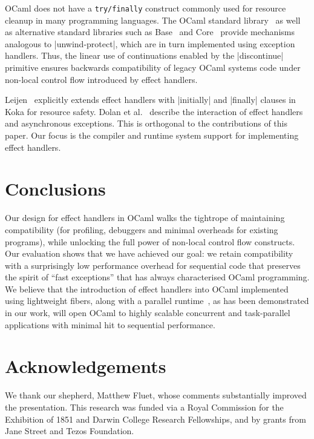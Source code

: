 \documentclass[sigplan,screen]{acmart}
\begin{document}
OCaml does not have a \texttt{\footnotesize try/finally} construct commonly
used for resource cleanup in many programming languages. The OCaml standard
library~\cite{FunProtect} as well as alternative standard libraries such as
Base~\cite{BaseProtect} and Core~\cite{CoreProtect} provide mechanisms
analogous to |unwind-protect|, which are in turn implemented using exception
handlers. Thus, the linear use of continuations enabled by the |discontinue|
primitive ensures backwards compatibility of legacy OCaml systems code under
non-local control flow introduced by effect handlers.

Leijen~\cite{Leijen18} explicitly extends effect handlers with |initially| and
|finally| clauses in Koka for resource safety. Dolan et al.~\cite{TFP17}
describe the interaction of effect handlers and asynchronous exceptions. This
is orthogonal to the contributions of this paper. Our focus is the compiler and
runtime system support for implementing effect handlers.

\section{Conclusions}
\label{sec:conc}

Our design for effect handlers in OCaml walks the tightrope of maintaining
compatibility (for profiling, debuggers and minimal overheads for existing
programs), while unlocking the full power of non-local control flow constructs.
Our evaluation shows that we have achieved our goal: we retain compatibility
with a surprisingly low performance overhead for sequential code that preserves
the spirit of ``fast exceptions'' that has always characterised OCaml
programming. We believe that the introduction of effect handlers into OCaml
implemented using lightweight fibers, along with a parallel
runtime~\cite{Sivaramakrishnan20}, as has been demonstrated in our work, will
open OCaml to highly scalable concurrent and task-parallel applications with
minimal hit to sequential performance.

\section*{Acknowledgements}

We thank our shepherd, Matthew Fluet, whose comments substantially improved the
presentation. This research was funded via a Royal Commission for the
Exhibition of 1851 and Darwin College Research Fellowships, and by grants from
Jane Street and Tezos Foundation.
\end{document}
